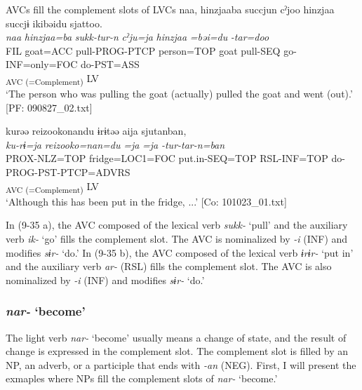 \ea   AVCs fill the complement slots of LVCs \label{ex:9.35}
\ea \label{ex:9.35a}%
 \gllll  naa,  hinzjaaba  succjun  cˀjoo  hinzjaa   succjɨ  ikibəidu  sjattoo.\\
      \textit{naa}  \textit{hinzjaa=ba}  \textit{sukk-tur-n}  \textit{cˀju=ja}  \textit{hinzjaa}  \textit{}  \textit{=bəi=du}  \textit{-tar=doo}\\
      FIL  goat=ACC  pull-PROG-PTCP  person=TOP  goat pull-SEQ  go-INF=only=FOC  do-PST=ASS\\
      [Lex. Verb  Aux. Verb]\textsubscript{AVC (=Complement)}  LV\\
      \glt       ‘The person who was pulling the goat (actually) pulled the goat and went (out).’ [PF: 090827\_02.txt]

\ex \label{ex:9.35b}%
\gllll kurəə  {\textbar}reizooko{\textbar}nandu  ɨrɨtəə  aija   sjutanban,\\
      \textit{ku-rɨ=ja}  \textit{reizooko=nan=du}  \textit{=ja}  \textit{=ja} \textit{-tur-tar-n=ban}\\
      PROX-NLZ=TOP  fridge=LOC1=FOC  put.in{}-SEQ=TOP  RSL-INF=TOP  do-PROG-PST-PTCP=ADVRS\\
          [Lex. Verb  Aux. Verb]\textsubscript{ AVC (=Complement)}  LV      \\
      \glt       ‘Although this has been put in the fridge, ...’ [Co: 101023\_01.txt]
    \z
\z

In (9-35 a), the AVC composed of the lexical verb \textit{sukk-} ‘pull’ and the auxiliary verb \textit{ik-} ‘go’ fills the complement slot. The AVC is nominalized by \textit{{}-i} (INF) and modifies \textit{sɨr-} ‘do.’ In (9-35 b), the AVC composed of the lexical verb \textit{ɨrɨr-} ‘put in’ and the auxiliary verb \textit{ar-} (RSL) fills the complement slot. The AVC is also nominalized by \textit{{}-i} (INF) and modifies \textit{sɨr-} ‘do.’

\subsubsection{\textit{nar-} ‘become’}\label{sec:9.1.2.2}

The light verb \textit{nar-} ‘become’ usually means a change of state, and the result of change is expressed in the complement slot. The complement slot is filled by an NP, an adverb, or a participle that ends with \textit{{}-an} (NEG). First, I will present the exmaples where NPs fill the complement slots of \textit{nar-} ‘become.’

